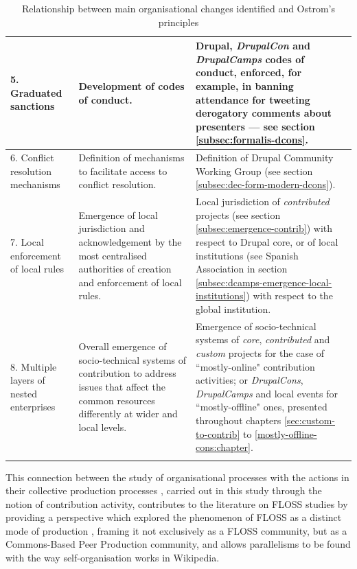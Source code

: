 \begin{footnotesize}
\begin{longtable}{|p{3cm}||p{4.7cm}|p{5.5cm}|}
 \\ \hline
5. Graduated sanctions
&
Development of codes of conduct.
&
Drupal, \textit{DrupalCon} and \textit{DrupalCamps} codes of conduct, enforced, for example, in banning attendance for tweeting derogatory comments about presenters ---  see section \ref{subsec:formalis-dcons}.
\\ \hline
6. Conflict resolution mechanisms
&
Definition of mechanisms to facilitate access to conflict resolution.
&
Definition of Drupal Community Working Group (see section \ref{subsec:dec-form-modern-dcons}).
\\ \hline
7. Local enforcement of local rules
&
Emergence of local jurisdiction and acknowledgement by the most centralised authorities of creation and enforcement of local rules. &
Local jurisdiction of \textit{contributed} projects (see section \ref{subsec:emergence-contrib}) with respect to Drupal core, or of local institutions (see Spanish Association in section \ref{subsec:dcamps-emergence-local-institutions}) with respect to the global institution.
\\ \hline
8. Multiple layers of nested enterprises
&
Overall emergence of socio-technical systems of contribution to address issues that affect the common resources differently at wider and local levels.
&
Emergence of socio-technical systems of \textit{core}, \textit{contributed} and \textit{custom} projects for the case of ``mostly-online" contribution activities; or \textit{DrupalCons}, \textit{DrupalCamps} and local events for ``mostly-offline" ones, presented throughout chapters \ref{sec:custom-to-contrib} to \ref{mostly-offline-cons:chapter}.
\\ \hline
\caption{Relationship between main organisational changes identified and Ostrom's principles}
\label{tab:ostrom}
\end{longtable}
\end{footnotesize}

This connection between the study of organisational processes with the actions in their collective production processes \parencite{Mahony2011}, carried out in this study through the notion of contribution activity, contributes to the literature on FLOSS studies by providing a perspective which explored the phenomenon of FLOSS as a distinct mode of production \parencite{glaser2007social}, framing it not exclusively as a FLOSS community, but as a Commons-Based Peer Production community, and allows parallelisms to be found with the way self-organisation works in Wikipedia.

